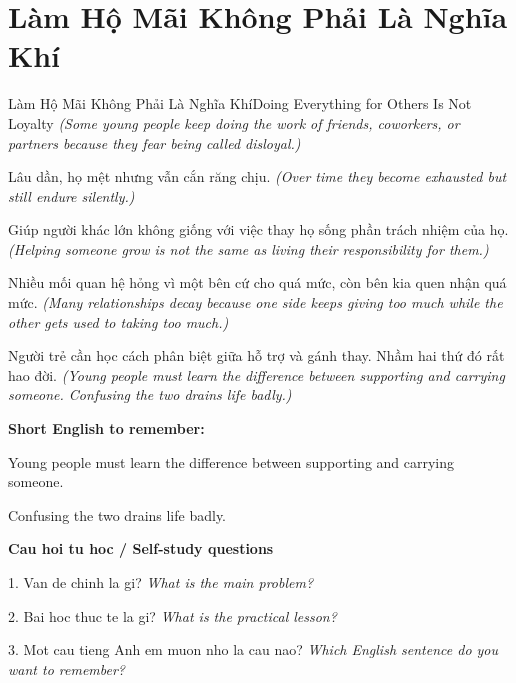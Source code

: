 \section{Làm Hộ Mãi Không Phải Là Nghĩa Khí}
\begin{truyen}{Làm Hộ Mãi Không Phải Là Nghĩa Khí}{Doing Everything for Others Is Not Loyalty}
\textit{(Some young people keep doing the work of friends, coworkers, or partners because they fear being called disloyal.)}

Lâu dần, họ mệt nhưng vẫn cắn răng chịu.
\textit{(Over time they become exhausted but still endure silently.)}

Giúp người khác lớn không giống với việc thay họ sống phần trách nhiệm của họ.
\textit{(Helping someone grow is not the same as living their responsibility for them.)}

Nhiều mối quan hệ hỏng vì một bên cứ cho quá mức, còn bên kia quen nhận quá mức.
\textit{(Many relationships decay because one side keeps giving too much while the other gets used to taking too much.)}

\end{truyen}

\begin{baihoc}
Người trẻ cần học cách phân biệt giữa hỗ trợ và gánh thay. Nhầm hai thứ đó rất hao đời.
\textit{(Young people must learn the difference between supporting and carrying someone. Confusing the two drains life badly.)}
\end{baihoc}

\begin{ghinhoanh}
\textbf{Short English to remember:}

Young people must learn the difference between supporting and carrying someone.

Confusing the two drains life badly.

\end{ghinhoanh}

\begin{tuhocnhanh}
\textbf{Cau hoi tu hoc / Self-study questions}

1. Van de chinh la gi? \textit{What is the main problem?}

2. Bai hoc thuc te la gi? \textit{What is the practical lesson?}

3. Mot cau tieng Anh em muon nho la cau nao? \textit{Which English sentence do you want to remember?}
\end{tuhocnhanh}
\ngancach

